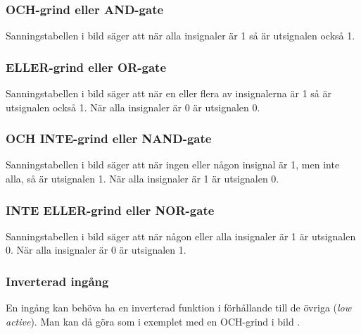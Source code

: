 \subsubsection{OCH-grind eller AND-gate}

Sanningstabellen i bild  säger att när alla insignaler
är 1 så är utsignalen också 1.

\subsubsection{ELLER-grind eller OR-gate}


Sanningstabellen i bild  säger att när en eller flera av
insignalerna är 1 så är utsignalen också 1.
När alla insignaler är 0 är utsignalen 0.

\subsubsection{OCH INTE-grind eller NAND-gate}

Sanningstabellen i bild  säger att när ingen eller någon
insignal är 1, men inte alla, så är utsignalen 1.
När alla insignaler är 1 är utsignalen 0.

\subsubsection{INTE ELLER-grind eller NOR-gate}

Sanningstabellen i bild  säger att när någon eller alla
insignaler är 1 är utsignalen 0.
När alla insignaler är 0 är utsignalen 1.

\subsubsection{Inverterad ingång}

En ingång kan behöva ha en inverterad funktion i förhållande till de övriga
(\emph{low active}).
Man kan då göra som i exemplet med en OCH-grind i bild .




